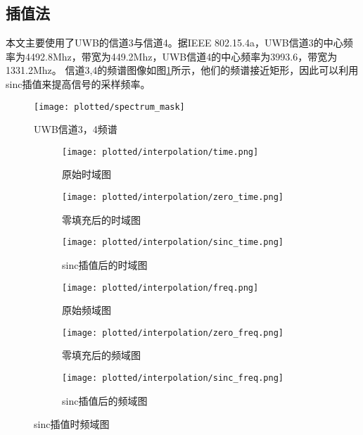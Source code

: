 \subsection{插值法}
本文主要使用了UWB的信道3与信道4。据IEEE 802.15.4a，UWB信道3的中心频率为4492.8Mhz，带宽为449.2Mhz，UWB信道4的中心频率为3993.6，带宽为1331.2Mhz。
信道3,4的频谱图像如图\ref{fig:spectrum_mask}所示，他们的频谱接近矩形，因此可以利用sinc插值来提高信号的采样频率。
\begin{figure}[htbp]
    \centering
    \texttt{[image: plotted/spectrum\_mask]}
    \caption{\label{fig:spectrum_mask}UWB信道3，4频谱}
\end{figure}

\begin{figure}[htbp]
    \centering
    \begin{subfigure}{0.33\textwidth}
        \centering
        \texttt{[image: plotted/interpolation/time.png]}
        \caption{\label{fig:time}原始时域图}
    \end{subfigure}%
    \begin{subfigure}{0.33\textwidth}
        \centering
        \texttt{[image: plotted/interpolation/zero\_time.png]}
        \caption{\label{fig:zero_time}零填充后的时域图}
    \end{subfigure}
    \begin{subfigure}{0.33\textwidth}
        \centering
        \texttt{[image: plotted/interpolation/sinc\_time.png]}
        \caption{\label{fig:sinc_time}sinc插值后的时域图}
    \end{subfigure}

    \begin{subfigure}{0.33\textwidth}
        \centering
        \texttt{[image: plotted/interpolation/freq.png]}
        \caption{\label{fig:freq}原始频域图}
    \end{subfigure}%
    \begin{subfigure}{0.33\textwidth}
        \centering
        \texttt{[image: plotted/interpolation/zero\_freq.png]}
        \caption{\label{fig:zero_freq}零填充后的频域图}
    \end{subfigure}
    \begin{subfigure}{0.33\textwidth}
        \centering
        \texttt{[image: plotted/interpolation/sinc\_freq.png]}
        \caption{\label{fig:sinc_freq}sinc插值后的频域图}
    \end{subfigure}
    \caption{sinc插值时频域图}
    \label{fig:interpolation}
\end{figure}

